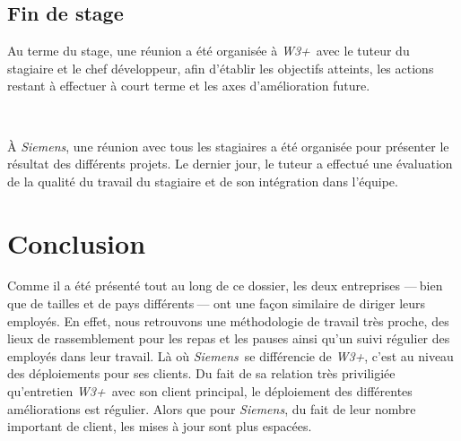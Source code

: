 \documentclass[a4paper, oneside, 12pt]{article}
\newcommand\sectionSpeciale[1]{\addcontentsline{toc}{section}{#1}\section*{#1}}
\def\www{\emph{W3+}}
\def\siemens{\emph{Siemens}}
\begin{document}
\subsection{Fin de stage}

Au terme du stage, une réunion a été organisée à \www\ avec le tuteur du stagiaire et le chef développeur, afin d’établir les objectifs atteints, les actions restant à effectuer à court terme et les axes d’amélioration future.

\ 

À \siemens, une réunion avec tous les stagiaires a été organisée pour présenter le résultat des différents projets. Le dernier jour, le tuteur a effectué une évaluation de la qualité du travail du stagiaire et de son intégration dans l’équipe.

\vfill

\sectionSpeciale{Conclusion}

Comme il a été présenté tout au long de ce dossier, les deux entreprises —$~$bien que de tailles et de pays différents$~$— ont une façon similaire de diriger leurs employés. En effet, nous retrouvons une méthodologie de travail très proche, des lieux de rassemblement pour les repas et les pauses ainsi qu'un suivi régulier des employés dans leur travail. Là où \siemens\ se différencie de \www, c'est au niveau des déploiements pour ses clients. Du fait de sa relation très priviligiée qu'entretien \www\ avec son client principal, le déploiement des différentes améliorations est régulier. Alors que pour \siemens, du fait de leur nombre important de client, les mises à jour sont plus espacées.

\vfill
\end{document}

